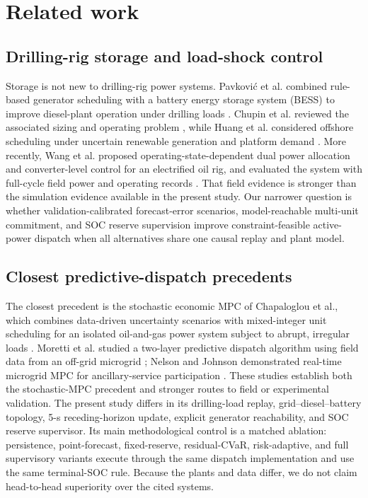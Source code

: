 \section{Related work}\label{related-work}

\subsection{Drilling-rig storage and load-shock control}

Storage is not new to drilling-rig power systems. Pavkovi\'{c} et al. combined
rule-based generator scheduling with a battery energy storage system (BESS) to
improve diesel-plant operation under drilling loads
\citep{pavkovic2016oil}. Chupin et al. reviewed the associated sizing and
operating problem \citep{chupin2021drillingstorage}, while Huang et al.
considered offshore scheduling under uncertain renewable generation and
platform demand \citep{huang2019drilling}. More recently, Wang et al. proposed
operating-state-dependent dual power allocation and converter-level control
for an electrified oil rig, and evaluated the system with full-cycle field
power and operating records \citep{wang2025dualpower}. That field evidence is
stronger than the simulation evidence available in the present study. Our
narrower question is whether validation-calibrated forecast-error scenarios,
model-reachable multi-unit commitment, and SOC reserve supervision improve
constraint-feasible active-power dispatch when all alternatives share one
causal replay and plant model.

\subsection{Closest predictive-dispatch precedents}

The closest precedent is the stochastic economic MPC of Chapaloglou et al.,
which combines data-driven uncertainty scenarios with mixed-integer unit
scheduling for an isolated oil-and-gas power system subject to abrupt,
irregular loads \citep{chapaloglou2022datadriven}. Moretti et al. studied a
two-layer predictive dispatch algorithm using field data from an off-grid
microgrid \citep{moretti2019twolayer}; Nelson and Johnson demonstrated
real-time microgrid MPC for ancillary-service participation
\citep{nelson2020realtime}. These studies establish both the stochastic-MPC
precedent and stronger routes to field or experimental validation. The present
study differs in its drilling-load replay, grid--diesel--battery topology,
5-s receding-horizon update, explicit generator reachability, and SOC reserve
supervisor. Its main methodological control is a matched ablation: persistence,
point-forecast, fixed-reserve, residual-CVaR, risk-adaptive, and full
supervisory variants execute through the same dispatch implementation and use
the same terminal-SOC rule. Because the plants and data differ, we do not claim
head-to-head superiority over the cited systems.

